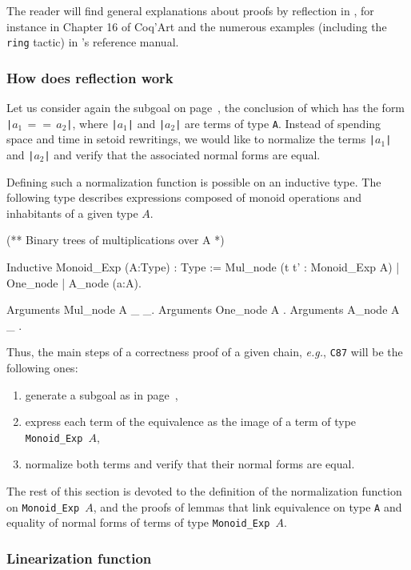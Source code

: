 The reader will find general explanations about proofs by reflection in \coq{},
for instance in Chapter 16 of Coq'Art\cite{BC04} and the numerous examples (including the \texttt{ring} tactic) 
in \coq's reference manual.


\subsubsection{How does reflection work}
Let us consider again the subgoal on page~\pageref{fig:big-goal}, the conclusion of which has the form \texttt{|$a_1\,==\,a_2$|}, where \texttt{|$a_1$|} and
\texttt{|$a_2$|} are terms of  type \texttt{A}.
Instead of spending space and time in setoid rewritings, we would like to
normalize the terms \texttt{|$a_1$|} and \texttt{|$a_2$|} and verify that 
the associated normal forms are equal.

Defining such a normalization function is possible on an inductive type.
The following type describes expressions composed of monoid operations and inhabitants of a given type $A$.

\begin{Coqsrc}
(** Binary trees of multiplications over A *)

Inductive Monoid_Exp (A:Type) : Type :=
 Mul_node (t t' : Monoid_Exp A) | One_node | A_node (a:A).

Arguments Mul_node {A} _ _.
Arguments One_node {A} .
Arguments A_node {A} _ .
\end{Coqsrc}




Thus, the main steps of a correctness proof of a given chain, \emph{e.g.},
\texttt{C87} will be the following ones:
\begin{enumerate}
\item generate a subgoal as in page~\pageref{fig:big-goal},
\item express each term of the equivalence as the image of a term
     of type \texttt{Monoid\_Exp $A$},
\item normalize both terms and verify that their normal forms are equal.
\end{enumerate}

The rest of this section is devoted to the definition of the normalization 
function on \texttt{Monoid\_Exp $A$}, and the proofs of lemmas that
link equivalence on type \texttt{A} and equality of normal forms
of terms of type \texttt{Monoid\_Exp $A$}.


\subsubsection{Linearization function}

